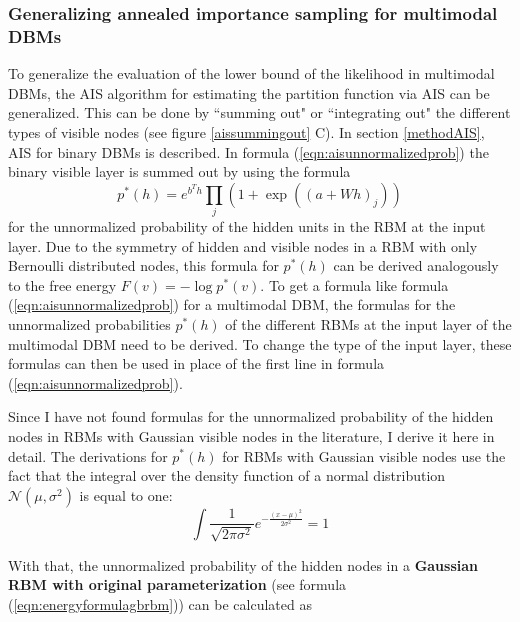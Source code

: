 \documentclass[12pt]{article}
\begin{document}
\subsubsection{Generalizing annealed importance sampling for multimodal DBMs} \label{unnormalizedprobsrbm}

To generalize the evaluation of the lower bound of the likelihood in multimodal DBMs, the AIS algorithm for estimating the partition function via AIS can be generalized.
This can be done by ``summing out" or ``integrating out" the different types of visible nodes (see figure \ref{aissummingout} C).
In section \ref{methodAIS}, AIS for binary DBMs is described.
In formula (\ref{eqn:aisunnormalizedprob}) the binary visible layer is summed out by using the formula 
\[
p^*(h) = e^{b^T h} \prod_j (1+ \exp((a + W h)_j))
\]
for the unnormalized probability of the hidden units in the RBM at the input layer.
Due to the symmetry of hidden and visible nodes in a RBM with only Bernoulli distributed nodes, this formula for $p^*(h)$ can be derived analogously to the free energy $F(v) = - \log p^*(v)$. 
To get a formula like formula (\ref{eqn:aisunnormalizedprob}) for a multimodal DBM, the formulas for the unnormalized probabilities $p^*(h)$ of the different RBMs at the input layer of the multimodal DBM need to be derived.
To change the type of the input layer, these formulas can then be used in place of the first line in formula (\ref{eqn:aisunnormalizedprob}).


Since I have not found formulas for the unnormalized probability of the hidden nodes in RBMs with Gaussian visible nodes in the literature, I derive it here in detail.
The derivations for $p^*(h)$ for RBMs with Gaussian visible nodes use the fact that the integral over the density function of a normal distribution $\mathcal{N}(\mu, \sigma^2)$ is equal to one:
\begin{equation} \int \frac{1}{\sqrt{2 \pi \sigma^2}} e^{ -\frac{(x - \mu)^2}{2 \sigma^2}} = 1  
\label{eqn:densitynormal}
\end{equation}

With that, the unnormalized probability of the hidden nodes in a {\bf Gaussian RBM with original parameterization} (see formula (\ref{eqn:energyformulagbrbm})) can be calculated as
\end{document}
